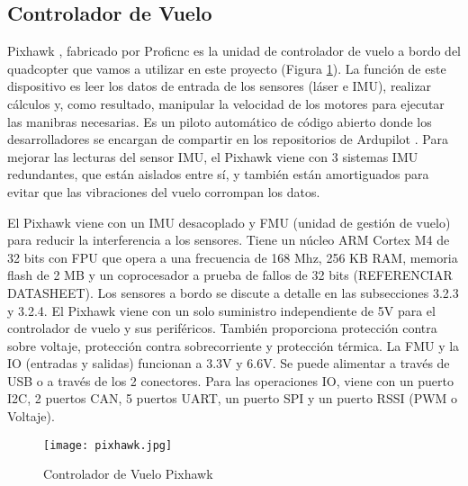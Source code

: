 \subsection{Controlador de Vuelo}
Pixhawk \cite{PixhawkHome}, fabricado por Proficnc es la unidad de controlador de vuelo a bordo del quadcopter que vamos a utilizar en este proyecto (Figura \ref{f:pixhawk}). La función de este dispositivo es leer los datos de entrada de los sensores (láser e IMU), realizar cálculos y, como resultado, manipular la velocidad de los motores para ejecutar las manibras necesarias. Es un piloto automático de código abierto donde los desarrolladores se encargan de compartir en los repositorios de Ardupilot \cite{Ardupilot}. Para mejorar las lecturas del sensor IMU, el Pixhawk viene con 3 sistemas IMU redundantes, que están aislados entre sí, y también están amortiguados para evitar que las vibraciones del vuelo corrompan los datos.

El Pixhawk viene con un IMU desacoplado y FMU (unidad de gestión de vuelo) para reducir la interferencia a los sensores. Tiene un núcleo ARM Cortex M4 de 32 bits con FPU que opera a una frecuencia de 168 Mhz, 256 KB RAM, memoria flash de 2 MB y un coprocesador a prueba de fallos de 32 bits (REFERENCIAR DATASHEET). Los sensores a bordo se discute a detalle en las subsecciones 3.2.3 y 3.2.4.
El Pixhawk viene con un solo suministro independiente de 5V para el controlador de vuelo y sus periféricos. También proporciona protección contra sobre voltaje, protección contra sobrecorriente y protección térmica. La FMU y la IO (entradas y salidas) funcionan a 3.3V y 6.6V. Se puede alimentar a través de USB o a través de los 2 conectores. Para las operaciones IO, viene con un puerto I2C, 2 puertos CAN, 5 puertos UART, un puerto SPI y un puerto RSSI (PWM o Voltaje).

\begin{figure}
\centering
\texttt{[image: pixhawk.jpg]}
\caption{Controlador de Vuelo Pixhawk}
\label{f:pixhawk}
\end{figure}



